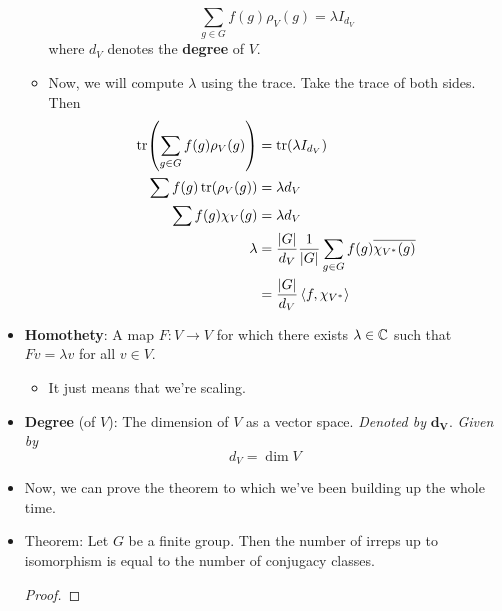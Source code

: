 \documentclass[../notes.tex]{subfiles}
\begin{document}
\begin{itemize}
\begin{itemize}
        \begin{equation*}
            \sum_{g\in G}f(g)\rho_V(g)
            = \lambda I_{d_V}
        \end{equation*}
        where $d_V$ denotes the \textbf{degree} of $V$.
        \item Now, we will compute $\lambda$ using the trace. Take the trace of both sides. Then
        \begin{align*}
            \tr(\sum_{g\in G}f(g)\rho_V(g))
            &= \tr(\lambda I_{d_V})\\
            \sum f(g)\tr(\rho_V(g)) &= \lambda d_V\\
            \sum f(g)\chi_V(g) &= \lambda d_V\\
            \lambda &= \frac{|G|}{d_V}\frac{1}{|G|}\sum_{g\in G}f(g)\overline{\chi_{V^*}(g)}\\
            &= \frac{|G|}{d_V}\left\langle{f,\chi_{V^*}}\right\rangle
        \end{align*}
    \end{itemize}
    \item \textbf{Homothety}: A map $F:V\to V$ for which there exists $\lambda\in\mathbb{C}$ such that $Fv=\lambda v$ for all $v\in V$.
    \begin{itemize}
        \item It just means that we're scaling.
    \end{itemize}
    \item \textbf{Degree} (of $V$): The dimension of $V$ as a vector space. \emph{Denoted by} $\bm{d_V}$. \emph{Given by}
    \begin{equation*}
        d_V = \dim V
    \end{equation*}
    \item Now, we can prove the theorem to which we've been building up the whole time.
    \item Theorem: Let $G$ be a finite group. Then the number of irreps up to isomorphism is equal to the number of conjugacy classes.
    \begin{proof}
        



\end{proof}
\end{itemize}
\end{document}
